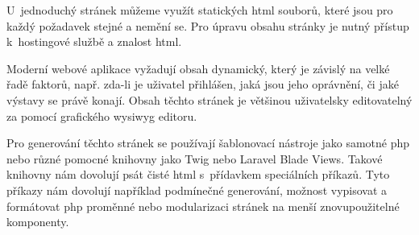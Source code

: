 U~jednoduchý stránek můžeme využít statických \acrshort{html} souborů, které jsou pro každý požadavek stejné a nemění se. Pro úpravu obsahu stránky je nutný přístup k~hostingové službě a znalost \acrshort{html}.

Moderní webové aplikace vyžadují obsah dynamický, který je závislý na velké řadě faktorů, např. zda-li je uživatel přihlášen, jaká jsou jeho oprávnění, či jaké výstavy se právě konají. Obsah těchto stránek je většinou uživatelsky editovatelný za pomocí grafického \acrshort{wysiwyg} editoru.

Pro generování těchto stránek se používají šablonovací nástroje jako samotné \acrshort{php} nebo různé pomocné knihovny jako Twig\cite{twig} nebo Laravel Blade Views\cite{laravel-blade}. Takové knihovny nám dovolují psát čisté \acrshort{html} s~přídavkem speciálních příkazů. Tyto příkazy nám dovolují například podmínečné generování, možnost vypisovat a formátovat \acrshort{php} proměnné nebo modularizaci stránek na menší znovupoužitelné komponenty.
